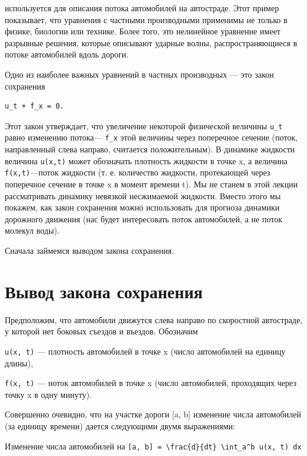 \documentclass[
  ukrainian,
]{article}
\begin{document}
используется для описания потока автомобилей на автостраде. Этот пример
показывает, что уравнения с частными производными применимы не только в
физике, биологии или технике. Более того, это нелинейное уравнение имеет
разрывные решения, которые описывают ударные волны, распространяющиеся в
потоке автомобилей вдоль дороги.

Одно из наиболее важных уравнений в частных производных --- это закон
сохранения

\begin{verbatim}
u_t + f_x = 0.
\end{verbatim}

Этот закон утверждает, что увеличение некоторой физической величины
\texttt{u\_t} равно изменению потока--- \texttt{f\_x} этой величины
через поперечное сечение (поток, направленный слева направо, считается
положительным). В динамике жидкости величина \texttt{u(x,t)} может
обозначать плотность жидкости в точке x, а величина
\texttt{f(x,t)}---поток жидкости (т. е. количество жидкости, протекающей
через поперечное сечение в точке x в момент времени t). Мы не станем в
этой лекции рассматривать динамику невязкой несжимаемой жидкости. Вместо
этого мы покажем, как закон сохранения можно использовать для прогноза
динамики дорожного движения (нас будет интересовать поток автомобилей, а
не поток молекул воды).

Сначала займемся выводом закона сохранения.

\section{Вывод закона
сохранения}\label{ux432ux44bux432ux43eux434-ux437ux430ux43aux43eux43dux430-ux441ux43eux445ux440ux430ux43dux435ux43dux438ux44f}

Предположим, что автомобили движутся слева направо по скоростной
автостраде, у которой нет боковых съездов и въездов. Обозначим

\texttt{u(x,\ t)} --- плотность автомобилей в точке x (число автомобилей
на единицу длины),

\texttt{f(x,\ t)} --- ноток автомобилей в точке x (число автомобилей,
проходящих через точку x в одну минуту).

Совершенно очевидно, что на участке дороги {[}a, b{]} изменение числа
автомобилей (за единицу времени) дается следующими двумя выражениями:

Изменение числа автомобилей на
\texttt{{[}a,\ b{]}\ =\ \textbackslash{}frac\{d\}\{dt\}\ \textbackslash{}int\_a\^{}b\ u(x,\ t)\ dx}
\end{document}
